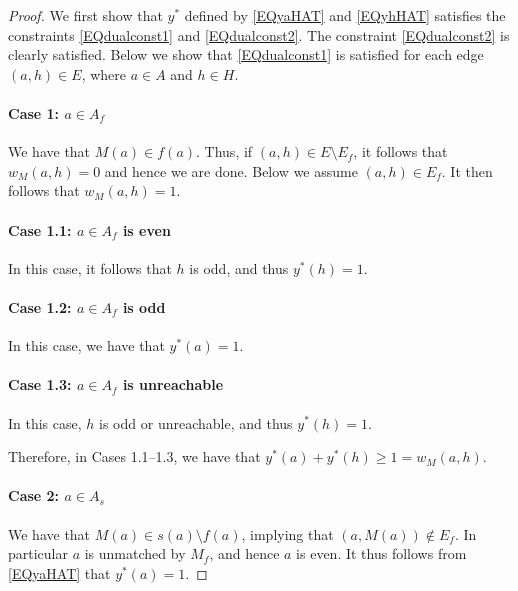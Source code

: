 \documentclass[11pt,a4paper,showkeys]{article}
\theoremstyle{plain}
\theoremstyle{definition}
\begin{document}
\begin{proof}
    We first show that $y^*$ defined by \eqref{EQyaHAT} and \eqref{EQyhHAT} satisfies the constraints 
    \eqref{EQdualconst1} and \eqref{EQdualconst2}. 
    The constraint \eqref{EQdualconst2} is clearly satisfied. 
    Below we show that \eqref{EQdualconst1} is satisfied for each edge $(a,h)\in E$, 
    where $a\in A$ and $h\in H$. 



    \paragraph{Case 1: $a\in A_f$}
    We have that $M(a)\in f(a)$. 
    Thus, if $(a,h)\in E \setminus E_f$, 
    it follows that $w_M(a,h)=0$ and hence we are done. 
    Below we assume $(a,h)\in E_f$. 
    It then follows that $w_M(a,h)=1$. 
    \paragraph{Case 1.1: $a\in A_f$ is even}
    In this case, 
    it follows that $h$ is odd, 
    and thus
    $y^*(h)=1$. 

    \paragraph{Case 1.2: $a\in A_f$ is odd}
    In this case, 
    we have that $y^*(a)=1$. 

    \paragraph{Case 1.3: $a\in A_f$ is unreachable}
    In this case, 
    $h$ is odd or unreachable, and thus $y^*(h)=1$. 

    Therefore, 
    in Cases 1.1--1.3, 
    we have that $y^*(a)+y^*(h)\ge 1 = w_M(a,h)$. 

    \paragraph{Case 2: $a\in A_s$}
    We have that $M(a)\in s(a)\setminus f(a)$, implying that $(a,M(a))\not \in E_f$. 
    In particular $a$ is unmatched by $M_f$, 
    and hence $a$ is even. 
    It thus follows from \eqref{EQyaHAT} that $y^*(a)=1$. 



\end{proof}
\end{document}
